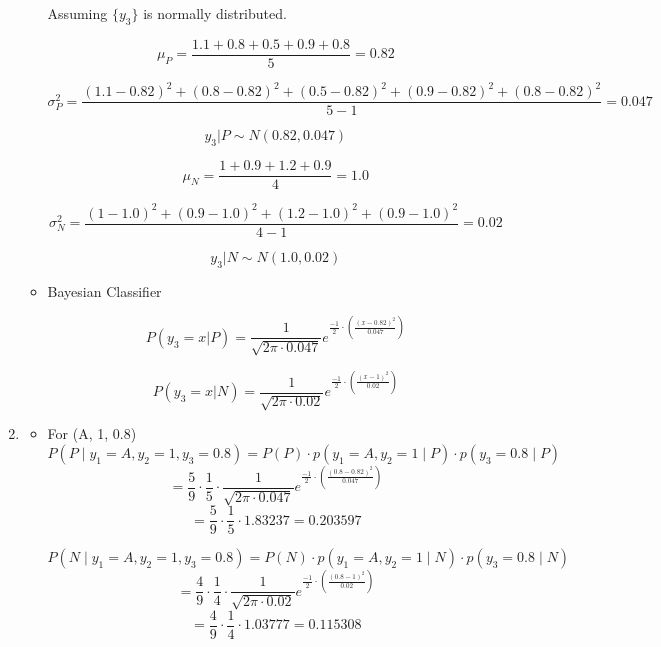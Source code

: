 \documentclass[12pt]{article}
\begin{document}
\begin{enumerate}[leftmargin=\labelsep, label=\textbf{\arabic*.)}]
\begin{itemize}
                    Assuming $\{y_3\}$ is normally distributed.

                    \[
                        \mu_P = \frac{1.1+0.8+0.5+0.9+0.8}{5} = 0.82
                    \]

                    \[
                        \sigma_P^2 = \frac{(1.1-0.82)^2 + (0.8-0.82)^2 + (0.5-0.82)^2 + (0.9-0.82)^2 + (0.8-0.82)^2}{5 - 1} = 0.047
                    \]

                    \[
                        y_3 | P \sim N(0.82, 0.047)
                    \]

                    \[
                        \mu_N = \frac{1+0.9+1.2+0.9}{4} = 1.0
                    \]

                    \[
                        \sigma_N^2 = \frac{(1-1.0)^2 + (0.9-1.0)^2 + (1.2-1.0)^2 + (0.9-1.0)^2}{4 - 1} = 0.02
                    \]

                    \[
                        y_3 | N \sim N(1.0, 0.02)
                    \]

              \item Bayesian Classifier

                    \[
                        P(y_3 = x | P) = \frac{1}{\sqrt{2\pi \cdot 0.047}} e^{\frac{-1}{2} \cdot (\frac{(x - 0.82)^2}{0.047})}
                    \]

                    \[
                        P(y_3 = x | N) = \frac{1}{\sqrt{2\pi \cdot 0.02}} e^{\frac{-1}{2} \cdot (\frac{(x - 1)^2}{0.02})}
                    \]

          \end{itemize}

    \item \begin{itemize}
              \item For (A, 1, 0.8)
                    \[
                        P(P \mid y_1 = A, y_2 = 1, y_3 = 0.8) = P(P) \cdot p(y_1 = A, y_2 = 1 \mid P) \cdot p(y_3 = 0.8 \mid P)
                    \]
                    \[
                        = \frac{5}{9} \cdot \frac{1}{5} \cdot \frac{1}{\sqrt{2\pi \cdot 0.047}} e^{\frac{-1}{2} \cdot (\frac{(0.8 - 0.82)^2}{0.047})}
                    \]
                    \[
                        = \frac{5}{9} \cdot \frac{1}{5} \cdot 1.83237 = 0.203597
                    \]

                    \[
                        P(N \mid y_1 = A, y_2 = 1, y_3 = 0.8) = P(N) \cdot p(y_1 = A, y_2 = 1 \mid N) \cdot p(y_3 = 0.8 \mid N)
                    \]
                    \[
                        = \frac{4}{9} \cdot \frac{1}{4} \cdot \frac{1}{\sqrt{2\pi \cdot 0.02}} e^{\frac{-1}{2} \cdot (\frac{(0.8 - 1)^2}{0.02})}
                    \]
                    \[
                        = \frac{4}{9} \cdot \frac{1}{4} \cdot 1.03777 = 0.115308
                    \]


\end{itemize}
\end{enumerate}
\end{document}
